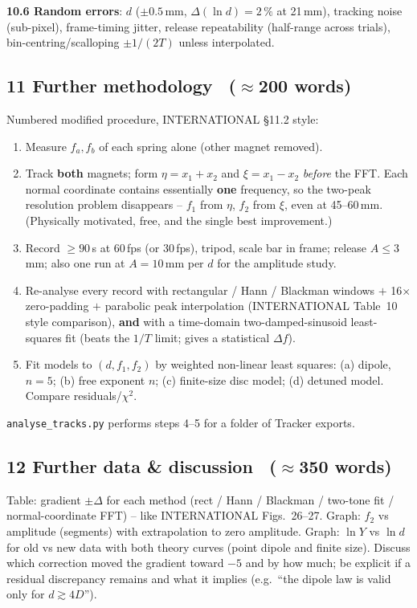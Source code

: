 \documentclass[11pt,a4paper]{article}
\newcommand{\Y}{Y}                                   %
\newcommand{\words}[1]{~{\small\color{gray}($\approx$#1 words)}}
\begin{document}
\textbf{10.6 Random errors}: $d$ ($\pm0.5$\,mm, $\Delta(\ln d)=2\,\%$ at 21\,mm), tracking
noise (sub-pixel), frame-timing jitter, release repeatability (half-range across trials),
bin-centring/scalloping $\pm1/(2T)$ unless interpolated.

\subsection*{11 Further methodology \words{200}}
Numbered modified procedure, INTERNATIONAL \S11.2 style:
\begin{enumerate}
\item Measure $f_a,f_b$ of each spring alone (other magnet removed).
\item Track \textbf{both} magnets; form $\eta=x_1+x_2$ and $\xi=x_1-x_2$ \emph{before} the
FFT. Each normal coordinate contains essentially \textbf{one} frequency, so the two-peak
resolution problem disappears -- $f_1$ from $\eta$, $f_2$ from $\xi$, even at 45--60\,mm.
(Physically motivated, free, and the single best improvement.)
\item Record $\ge90$\,s at 60\,fps (or 30\,fps), tripod, scale bar in frame; release
$A\le3$\,mm; also one run at $A=10$\,mm per $d$ for the amplitude study.
\item Re-analyse every record with rectangular / Hann / Blackman windows $+$ 16$\times$
zero-padding $+$ parabolic peak interpolation (INTERNATIONAL Table~10 style comparison),
\textbf{and} with a time-domain two-damped-sinusoid least-squares fit (beats the $1/T$
limit; gives a statistical $\Delta f$).
\item Fit models to $(d,f_1,f_2)$ by weighted non-linear least squares: (a) dipole,
$n=5$; (b) free exponent $n$; (c) finite-size disc model; (d) detuned model. Compare
residuals/$\chi^2$.
\end{enumerate}
\texttt{analyse\_tracks.py} performs steps 4--5 for a folder of Tracker exports.

\subsection*{12 Further data \& discussion \words{350}}
Table: gradient $\pm\Delta$ for each method (rect / Hann / Blackman / two-tone fit /
normal-coordinate FFT) -- like INTERNATIONAL Figs.~26--27. Graph: $f_2$ vs amplitude
(segments) with extrapolation to zero amplitude. Graph: $\ln\Y$ vs $\ln d$ for old vs new
data with both theory curves (point dipole and finite size). Discuss which correction
moved the gradient toward $-5$ and by how much; be explicit if a residual discrepancy
remains and what it implies (e.g.\ ``the dipole law is valid only for $d\gtrsim4D$'').
\end{document}
